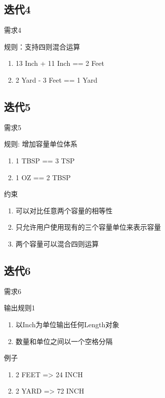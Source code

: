 \subsection{迭代4}

\begin{frame}{需求4}
  \begin{block}{规则：支持四则混合运算}
    \begin{enumerate}
      \item 13 Inch + 11 Inch == 2 Feet
      \item 2 Yard - 3 Feet == 1 Yard
    \end{enumerate}
  \end{block}
\end{frame}

\subsection{迭代5}

\begin{frame}{需求5}
  \begin{block}{规则: 增加容量单位体系}
    \begin{enumerate}
      \item 1 TBSP == 3 TSP
      \item 1 OZ == 2 TBSP
    \end{enumerate}
  \end{block}

  \begin{block}{约束}
    \begin{enumerate}
      \item 可以对比任意两个容量的相等性
      \item 只允许用户使用现有的三个容量单位来表示容量
      \item 两个容量可以混合四则运算
    \end{enumerate}
  \end{block}
\end{frame}

\subsection{迭代6}

\begin{frame}{需求6}
  \begin{block}{输出规则1}
    \begin{enumerate}
      \item 以Inch为单位输出任何Length对象
      \item 数量和单位之间以一个空格分隔
    \end{enumerate}
  \end{block}

  \begin{block}{例子}
    \begin{enumerate}
      \item 2 FEET => 24 INCH
      \item 2 YARD => 72 INCH
    \end{enumerate}
  \end{block}
\end{frame}

